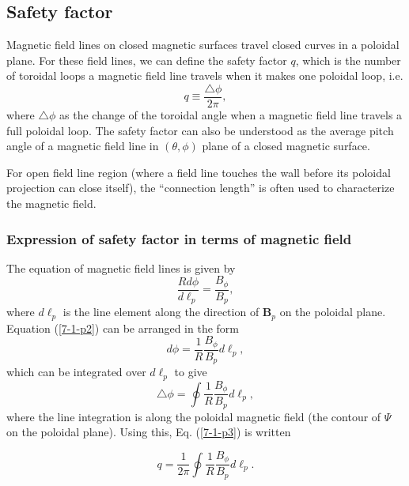 \documentclass{llncs}
\begin{document}
\subsection{Safety factor}

Magnetic field lines on closed magnetic surfaces travel closed curves in a
poloidal plane. For these field lines, we can define the safety factor $q$,
which is the number of toroidal loops a magnetic field line travels when it
makes one poloidal loop, i.e.
\begin{equation}
  \label{7-1-p3} q \equiv \frac{\triangle \phi}{2 \pi},
\end{equation}
where $\triangle \phi$ as the change of the toroidal angle when a magnetic
field line travels a full poloidal loop. The safety factor can also be
understood as the average pitch angle of a magnetic field line in $(\theta,
\phi)$ plane of a closed magnetic surface.

For open field line region (where a field line touches the wall before its
poloidal projection can close itself), the ``connection length'' is often used
to characterize the magnetic field.

\subsubsection{Expression of safety factor in terms of magnetic field}

The equation of magnetic field lines is given by
\begin{equation}
  \label{7-1-p2} \frac{R d \phi}{d \ell_p} = \frac{B_{\phi}}{B_p},
\end{equation}
where $d \ell_p$ is the line element along the direction of $\mathbf{B}_p$ on
the poloidal plane. Equation (\ref{7-1-p2}) can be arranged in the form
\begin{equation}
  d \phi = \frac{1}{R} \frac{B_{\phi}}{B_p} d \ell_p,
\end{equation}
which can be integrated over $d \ell_p$ to give
\begin{equation}
  \triangle \phi = \oint \frac{1}{R}  \frac{B_{\phi}}{B_p} d \ell_p,
\end{equation}
where the line integration is along the poloidal magnetic field (the contour
of $\Psi$ on the poloidal plane). Using this, Eq. (\ref{7-1-p3}) is written


\begin{equation}
  \label{9-5-e1} q = \frac{1}{2 \pi} \oint \frac{1}{R}  \frac{B_{\phi}}{B_p} d
  \ell_p .
\end{equation}
\end{document}
